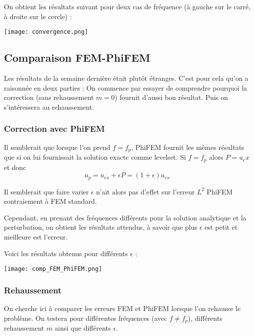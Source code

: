 On obtient les résultats suivant pour deux cas de fréquence (à gauche sur le carré, à droite sur le cercle) :

\begin{minipage}{\linewidth}
	\centering
	\texttt{[image: convergence.png]}
\end{minipage}

\subsection{Comparaison FEM-PhiFEM}

Les résultats de la semaine dernière était plutôt étranges. C'est pour cela qu'on a raisonnée en deux parties : On commence par essayer de comprendre pourquoi la correction (sans rehaussement $m=0$) fournit d'aussi bon résultat. Puis on s'intéressera au rehaussement.

\subsubsection*{Correction avec PhiFEM}

Il semblerait que lorsque l'on prend $f=f_p$, PhiFEM fournit les mêmes résultats que si on lui fournissait la solution exacte comme levelset. Si $f=f_p$ alors $P=u_ex$ et donc 
$$u_p=u_{ex}+\epsilon P=(1+\epsilon)u_{ex}$$

Il semblerait que faire varier $\epsilon$ n'ait alors pas d'effet sur l'erreur $L^2$ PhiFEM contraiement à FEM standard.

Cependant, en prenant des fréquences différents pour la solution analytique et la perturbation, on obtient les résultats attendus, à savoir que plus $\epsilon$ est petit et meilleure est l'erreur. 

Voici les résultats obtenus pour différents $\epsilon$ :

\begin{minipage}{\linewidth}
	\centering
	\texttt{[image: comp\_FEM\_PhiFEM.png]}
\end{minipage}

\subsubsection*{Rehaussement}

On cherche ici à comparer les erreurs FEM et PhiFEM lorsque l'on rehausse le problème. On testera pour différentes fréquences (avec $f\ne f_p$), différents rehaussement $m$ ainsi que différents $\epsilon$.

